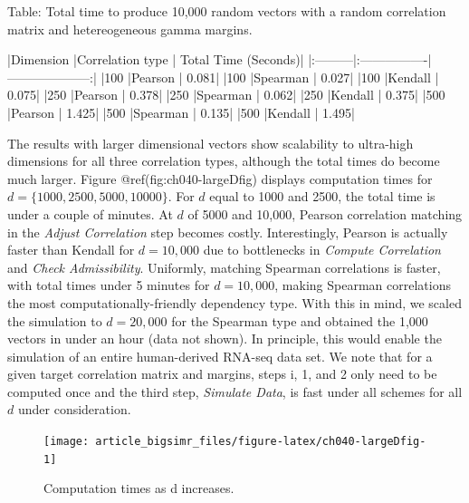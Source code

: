 \documentclass[
]{jss}
\begin{document}
\begin{CodeChunk}


Table: Total time to produce 10,000 random vectors with a random correlation matrix and hetereogeneous gamma margins.

|Dimension |Correlation type | Total Time (Seconds)|
|:---------|:----------------|--------------------:|
|100       |Pearson          |                0.081|
|100       |Spearman         |                0.027|
|100       |Kendall          |                0.075|
|250       |Pearson          |                0.378|
|250       |Spearman         |                0.062|
|250       |Kendall          |                0.375|
|500       |Pearson          |                1.425|
|500       |Spearman         |                0.135|
|500       |Kendall          |                1.495|

\end{CodeChunk}

The results with larger dimensional vectors show scalability to
ultra-high dimensions for all three correlation types, although the
total times do become much larger. Figure @ref(fig:ch040-largeDfig)
displays computation times for \(d=\{1000, 2500, 5000, 10000\}\). For
\(d\) equal to 1000 and 2500, the total time is under a couple of
minutes. At \(d\) of 5000 and 10,000, Pearson correlation matching in
the \emph{Adjust Correlation} step becomes costly. Interestingly,
Pearson is actually faster than Kendall for \(d=10,000\) due to
bottlenecks in \emph{Compute Correlation} and \emph{Check
Admissibility}. Uniformly, matching Spearman correlations is faster,
with total times under 5 minutes for \(d=10,000\), making Spearman
correlations the most computationally-friendly dependency type. With
this in mind, we scaled the simulation to \(d=20,000\) for the Spearman
type and obtained the 1,000 vectors in under an hour (data not shown).
In principle, this would enable the simulation of an entire
human-derived RNA-seq data set. We note that for a given target
correlation matrix and margins, steps i, 1, and 2 only need to be
computed once and the third step, \emph{Simulate Data}, is fast under
all schemes for all \(d\) under consideration.

\begin{CodeChunk}
\begin{figure}

{\centering \texttt{[image: article\_bigsimr\_files/figure-latex/ch040-largeDfig-1]} 

}

\caption[Computation times as d increases]{Computation times as d increases.}\label{fig:ch040-largeDfig}
\end{figure}
\end{CodeChunk}
\end{document}
